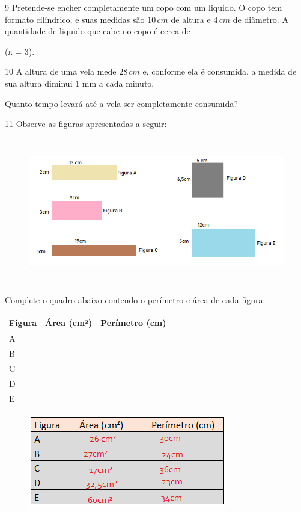 {\num{9}  Pretende-se encher completamente um copo com um liquido. O copo tem
formato cilíndrico, e suas medidas são $10\,cm$ de altura e $4\,cm$ de
diâmetro. A quantidade de liquido que cabe no copo é cerca de

(π = $3$).


\num{10}  A altura de uma vela mede $28\,cm$ e, conforme ela é consumida, a
medida de sua altura diminui $1$ mm a cada minuto.

Quanto tempo levará até a vela ser completamente consumida?


\num{11}  Observe as figuras apresentadas a seguir:

\begin{figure}
\includegraphics[width=5.90625in,height=2.51042in]{./imgSAEB_6_MAT/media/image98.png}
\end{figure}

Complete o quadro abaixo contendo o perímetro e área de cada figura.


\begin{longtable}[]{@{}lll@{}}
\toprule
Figura & Área (cm²) & Perímetro (cm)\tabularnewline
\midrule
\endhead
A & ~ & ~\tabularnewline
B & ~ & ~\tabularnewline
C & ~ & ~\tabularnewline
D & ~ & ~\tabularnewline
E & ~ & ~\tabularnewline
\bottomrule
\end{longtable}


\begin{figure}
\includegraphics[width=3.44792in,height=1.58333in]{./imgSAEB_6_MAT/media/image99.png}
\end{figure}

}
